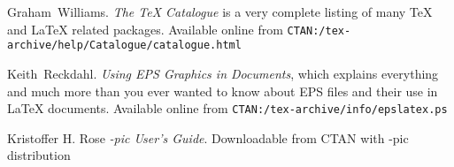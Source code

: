 \begin{thebibliography}{99}
 Graham~Williams.  \newblock \emph{The TeX
    Catalogue} is a very complete listing of many \TeX{} and \LaTeX{}
    related packages.
  \newblock Available online from \texttt{CTAN:/tex-archive/help/Catalogue/catalogue.html}
  
 Keith~Reckdahl.  \newblock \emph{Using EPS Graphics in
    \LaTeXe{} Documents}, which explains everything and much more than
  you ever wanted to know about EPS files and their use in \LaTeX{}
  documents.  \newblock Available online from
  \texttt{CTAN:/tex-archive/info/epslatex.ps}

 Kristoffer H. Rose
  \newblock \emph{\Xy-pic User's Guide}.  \newblock
  Downloadable from CTAN with \Xy-pic distribution 

\end{thebibliography}


%

